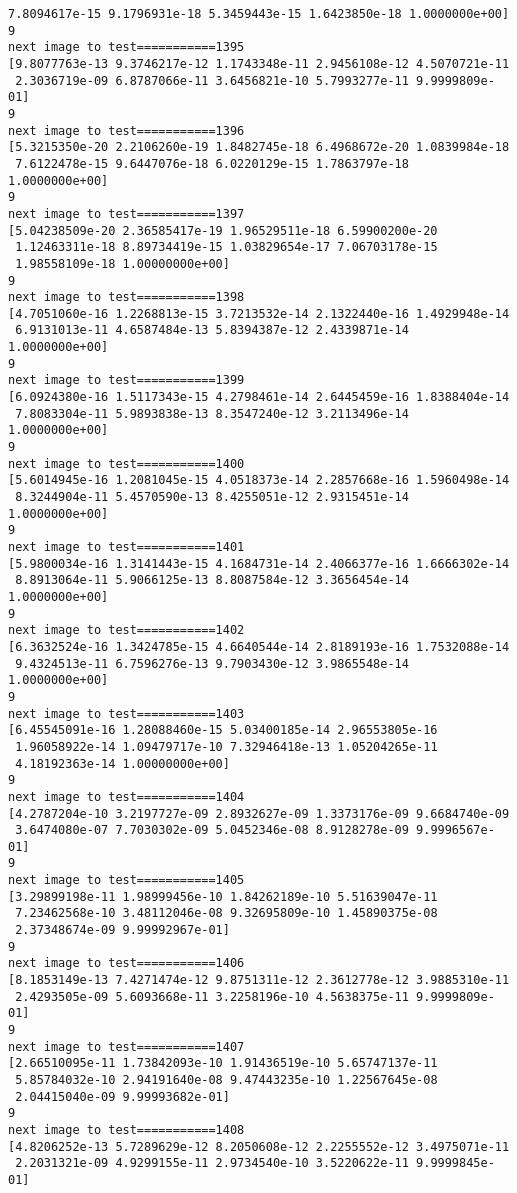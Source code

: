 \documentclass[11pt]{article}
\begin{document}
\begin{Verbatim}[commandchars=\\\{\}]
 7.8094617e-15 9.1796931e-18 5.3459443e-15 1.6423850e-18 1.0000000e+00]
9
next image to test===========1395
[9.8077763e-13 9.3746217e-12 1.1743348e-11 2.9456108e-12 4.5070721e-11
 2.3036719e-09 6.8787066e-11 3.6456821e-10 5.7993277e-11 9.9999809e-01]
9
next image to test===========1396
[5.3215350e-20 2.2106260e-19 1.8482745e-18 6.4968672e-20 1.0839984e-18
 7.6122478e-15 9.6447076e-18 6.0220129e-15 1.7863797e-18 1.0000000e+00]
9
next image to test===========1397
[5.04238509e-20 2.36585417e-19 1.96529511e-18 6.59900200e-20
 1.12463311e-18 8.89734419e-15 1.03829654e-17 7.06703178e-15
 1.98558109e-18 1.00000000e+00]
9
next image to test===========1398
[4.7051060e-16 1.2268813e-15 3.7213532e-14 2.1322440e-16 1.4929948e-14
 6.9131013e-11 4.6587484e-13 5.8394387e-12 2.4339871e-14 1.0000000e+00]
9
next image to test===========1399
[6.0924380e-16 1.5117343e-15 4.2798461e-14 2.6445459e-16 1.8388404e-14
 7.8083304e-11 5.9893838e-13 8.3547240e-12 3.2113496e-14 1.0000000e+00]
9
next image to test===========1400
[5.6014945e-16 1.2081045e-15 4.0518373e-14 2.2857668e-16 1.5960498e-14
 8.3244904e-11 5.4570590e-13 8.4255051e-12 2.9315451e-14 1.0000000e+00]
9
next image to test===========1401
[5.9800034e-16 1.3141443e-15 4.1684731e-14 2.4066377e-16 1.6666302e-14
 8.8913064e-11 5.9066125e-13 8.8087584e-12 3.3656454e-14 1.0000000e+00]
9
next image to test===========1402
[6.3632524e-16 1.3424785e-15 4.6640544e-14 2.8189193e-16 1.7532088e-14
 9.4324513e-11 6.7596276e-13 9.7903430e-12 3.9865548e-14 1.0000000e+00]
9
next image to test===========1403
[6.45545091e-16 1.28088460e-15 5.03400185e-14 2.96553805e-16
 1.96058922e-14 1.09479717e-10 7.32946418e-13 1.05204265e-11
 4.18192363e-14 1.00000000e+00]
9
next image to test===========1404
[4.2787204e-10 3.2197727e-09 2.8932627e-09 1.3373176e-09 9.6684740e-09
 3.6474080e-07 7.7030302e-09 5.0452346e-08 8.9128278e-09 9.9996567e-01]
9
next image to test===========1405
[3.29899198e-11 1.98999456e-10 1.84262189e-10 5.51639047e-11
 7.23462568e-10 3.48112046e-08 9.32695809e-10 1.45890375e-08
 2.37348674e-09 9.99992967e-01]
9
next image to test===========1406
[8.1853149e-13 7.4271474e-12 9.8751311e-12 2.3612778e-12 3.9885310e-11
 2.4293505e-09 5.6093668e-11 3.2258196e-10 4.5638375e-11 9.9999809e-01]
9
next image to test===========1407
[2.66510095e-11 1.73842093e-10 1.91436519e-10 5.65747137e-11
 5.85784032e-10 2.94191640e-08 9.47443235e-10 1.22567645e-08
 2.04415040e-09 9.99993682e-01]
9
next image to test===========1408
[4.8206252e-13 5.7289629e-12 8.2050608e-12 2.2255552e-12 3.4975071e-11
 2.2031321e-09 4.9299155e-11 2.9734540e-10 3.5220622e-11 9.9999845e-01]

\end{Verbatim}
\end{document}

